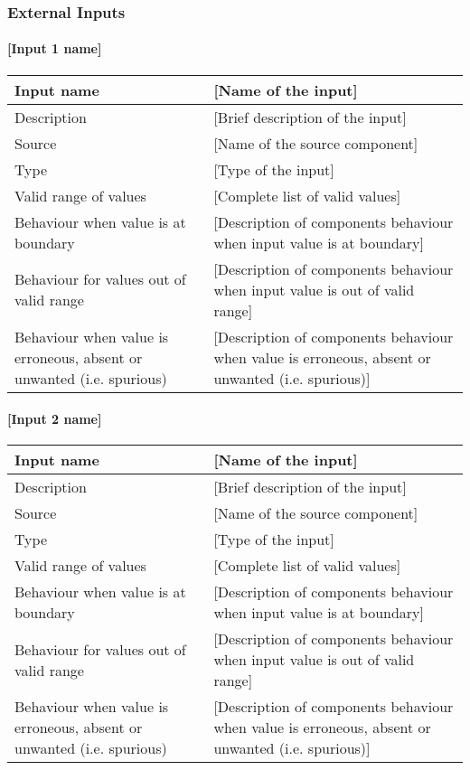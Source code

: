 \subsubsection{External Inputs}

\paragraph{[Input 1 name]}

\begin{longtable}{p{}p{}}
\toprule
Input name				& [Name of the input] \\
\midrule
Description				& [Brief description of the input] \\
\midrule
Source					& [Name of the source component] \\ 
\midrule
Type					& [Type of the input] \\
\midrule
Valid range of values	& [Complete list of valid values] \\
\midrule
Behaviour when value is at boundary	& [Description of components behaviour when input value is at boundary] \\
\midrule
Behaviour for values out of valid range	& [Description of components behaviour when input value is out of valid range] \\
\midrule
Behaviour when value is erroneous, absent or unwanted (i.e. spurious) & [Description of components behaviour when value is erroneous, absent or unwanted (i.e. spurious)] \\
\bottomrule
\end{longtable}

\paragraph{[Input 2 name]}

\begin{longtable}{p{}p{}}
\toprule
Input name				& [Name of the input] \\
\midrule
Description				& [Brief description of the input] \\
\midrule
Source					& [Name of the source component] \\ 
\midrule
Type					& [Type of the input] \\
\midrule
Valid range of values	& [Complete list of valid values] \\
\midrule
Behaviour when value is at boundary	& [Description of components behaviour when input value is at boundary] \\
\midrule
Behaviour for values out of valid range	& [Description of components behaviour when input value is out of valid range] \\
\midrule
Behaviour when value is erroneous, absent or unwanted (i.e. spurious) & [Description of components behaviour when value is erroneous, absent or unwanted (i.e. spurious)] \\
\bottomrule
\end{longtable}


